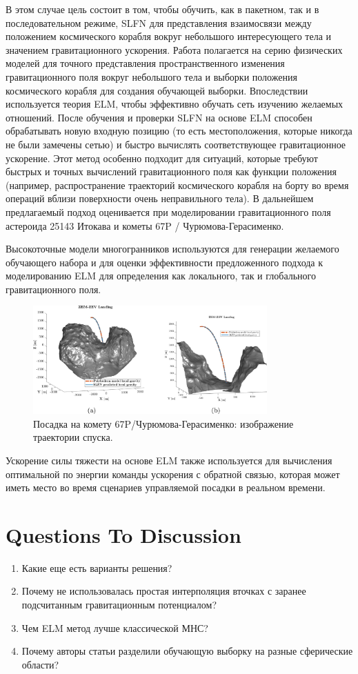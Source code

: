 В этом случае цель состоит в том, чтобы обучить, как в пакетном, так и в последовательном режиме, SLFN для представления взаимосвязи между положением космического корабля вокруг небольшого интересующего тела и значением гравитационного ускорения.
Работа полагается на серию физических моделей для точного представления пространственного изменения гравитационного поля вокруг небольшого тела и выборки положения космического корабля для создания обучающей выборки.
Впоследствии используется теория ELM, чтобы эффективно обучать сеть изучению желаемых отношений. После обучения и проверки SLFN на основе ELM способен обрабатывать новую входную позицию (то есть местоположения, которые никогда не были замечены сетью) и быстро вычислять соответствующее гравитационное ускорение.
Этот метод особенно подходит для ситуаций, которые требуют быстрых и точных вычислений гравитационного поля как функции положения (например, распространение траекторий космического корабля на борту во время операций вблизи поверхности очень неправильного тела).
В дальнейшем предлагаемый подход оценивается при моделировании гравитационного поля астероида 25143 Итокава и кометы 67P / Чурюмова-Герасименко.

Высокоточные модели многогранников используются для генерации желаемого обучающего набора и для оценки эффективности предложенного подхода к моделированию ELM для определения как локального, так и глобального гравитационного поля.
\begin{figure}[h]
    \centering
    \includegraphics[width=0.8\textwidth]{chapters/tikhonov_s2/images/traj_2}
    \caption{Посадка на комету 67P/Чурюмова-Герасименко: изображение траектории спуска.}
    \label{fg:1}
\end{figure}

Ускорение силы тяжести на основе ELM также используется для вычисления оптимальной по энергии команды ускорения с обратной связью, которая может иметь место во время сценариев управляемой посадки в реальном времени.
\section{Questions To Discussion}
\begin{enumerate}
    \item Какие еще есть варианты решения?
    \item Почему не использовалась простая интерполяция вточках с заранее подсчитанным гравитационным потенциалом?
    \item Чем ELM метод лучше классической МНС?
    \item Почему авторы статьи разделили обучающую выборку на разные сферические области?
\end{enumerate}